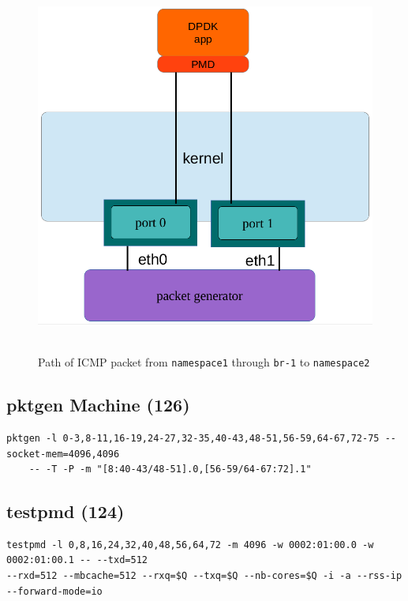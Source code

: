 \documentclass[letter]{article}
\begin{document}
{{\begin{figure}[H]
\caption{Path of ICMP packet from \texttt{namespace1} through \texttt{br-1} to \texttt{namespace2}}
\hbox{\hspace{-0.5cm} \includegraphics{i-o-2-ports} }
\end{figure}

\subsection{pktgen Machine (126)}

\begin{lstlisting}
pktgen -l 0-3,8-11,16-19,24-27,32-35,40-43,48-51,56-59,64-67,72-75 --socket-mem=4096,4096 
	-- -T -P -m "[8:40-43/48-51].0,[56-59/64-67:72].1"
\end{lstlisting}

\subsection{testpmd (124)}

\begin{lstlisting}[escapechar=!]
testpmd -l 0,8,16,24,32,40,48,56,64,72 -m 4096 -w 0002:01:00.0 -w 0002:01:00.1 -- --txd=512
--rxd=512 --mbcache=512 --rxq=$Q --txq=$Q --nb-cores=$Q -i -a --rss-ip --forward-mode=io
\end{lstlisting}

}}
\end{document}
